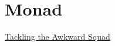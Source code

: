 \chapter{Monad}

\href{https://github.com/papers-we-love/papers-we-love/blob/master/languages/haskell/tackling-the-awkward-squad-monadic-input-output-concurrency-exceptions-and-foreign-language-calls-in-haskell.pdf}{Tackling the Awkward Squad}